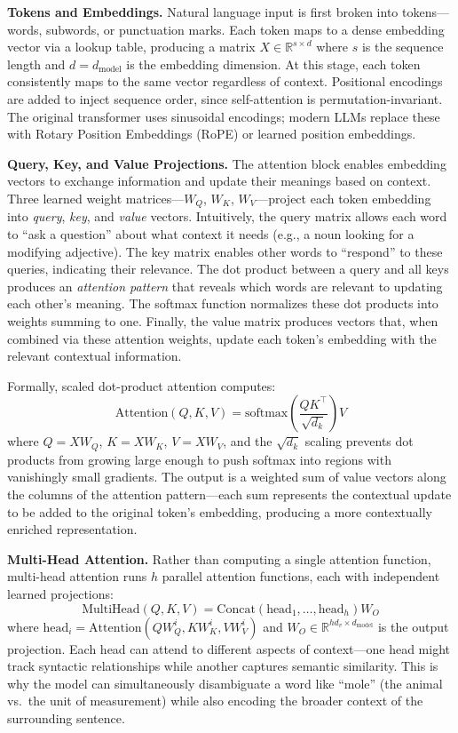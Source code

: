 \documentclass[11pt,letterpaper]{article}
\theoremstyle{definition}
\begin{document}
\textbf{Tokens and Embeddings.} Natural language input is first broken into tokens---words, subwords, or punctuation marks. Each token maps to a dense embedding vector via a lookup table, producing a matrix $X \in \mathbb{R}^{s \times d}$ where $s$ is the sequence length and $d = d_{\text{model}}$ is the embedding dimension. At this stage, each token consistently maps to the same vector regardless of context. Positional encodings are added to inject sequence order, since self-attention is permutation-invariant. The original transformer uses sinusoidal encodings; modern LLMs replace these with Rotary Position Embeddings (RoPE) or learned position embeddings.

\textbf{Query, Key, and Value Projections.} The attention block enables embedding vectors to exchange information and update their meanings based on context. Three learned weight matrices---$W_Q$, $W_K$, $W_V$---project each token embedding into \emph{query}, \emph{key}, and \emph{value} vectors. Intuitively, the query matrix allows each word to ``ask a question'' about what context it needs (e.g., a noun looking for a modifying adjective). The key matrix enables other words to ``respond'' to these queries, indicating their relevance. The dot product between a query and all keys produces an \emph{attention pattern} that reveals which words are relevant to updating each other's meaning. The softmax function normalizes these dot products into weights summing to one. Finally, the value matrix produces vectors that, when combined via these attention weights, update each token's embedding with the relevant contextual information.

Formally, scaled dot-product attention computes:
\begin{equation}
    \text{Attention}(Q, K, V) = \text{softmax}\!\left(\frac{QK^\top}{\sqrt{d_k}}\right) V
\end{equation}
where $Q = XW_Q$, $K = XW_K$, $V = XW_V$, and the $\sqrt{d_k}$ scaling prevents dot products from growing large enough to push softmax into regions with vanishingly small gradients. The output is a weighted sum of value vectors along the columns of the attention pattern---each sum represents the contextual update to be added to the original token's embedding, producing a more contextually enriched representation.

\textbf{Multi-Head Attention.} Rather than computing a single attention function, multi-head attention runs $h$ parallel attention functions, each with independent learned projections:
\begin{equation}
    \text{MultiHead}(Q, K, V) = \text{Concat}(\text{head}_1, \ldots, \text{head}_h) W_O
\end{equation}
where $\text{head}_i = \text{Attention}(QW_Q^i, KW_K^i, VW_V^i)$ and $W_O \in \mathbb{R}^{hd_v \times d_{\text{model}}}$ is the output projection. Each head can attend to different aspects of context---one head might track syntactic relationships while another captures semantic similarity. This is why the model can simultaneously disambiguate a word like ``mole'' (the animal vs.\ the unit of measurement) while also encoding the broader context of the surrounding sentence.
\end{document}
